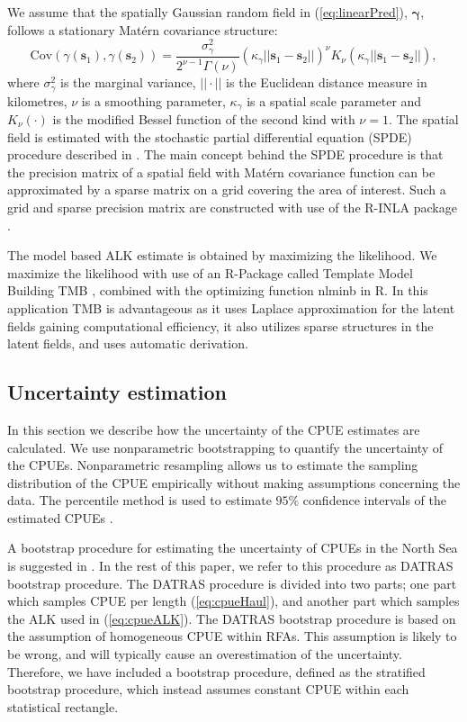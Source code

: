 \documentclass[a4paper 12pt]{article}
\numberwithin{equation}{section}
\begin{document}
\indent We assume that the spatially Gaussian random field in (\ref{eq:linearPred}), $\pmb{\gamma}$, follows a stationary Mat\'{e}rn covariance structure:
\begin{equation}\label{eq:matern}
 \text{Cov}(\gamma(\mathbf{s}_1),\gamma(\mathbf{s}_2)) = \frac{\sigma^2_{\gamma}}{2^{\nu-1}\Gamma(\nu)}(\kappa_{\gamma}||\mathbf{s}_1 -\mathbf{s}_2||)^{\nu}K_{\nu}(\kappa_{\gamma}||\mathbf{s}_1-\mathbf{s}_2||),
\end{equation}
where $\sigma^2_{\gamma}$ is the marginal variance, $||\cdot||$ is the Euclidean distance measure in kilometres, $\nu$ is a smoothing parameter, $\kappa_{\gamma}$ is a spatial scale parameter and $K_{\nu}(\cdot)$ is the modified Bessel function of the second kind with $\nu = 1$. The spatial field is estimated with the stochastic partial differential equation (SPDE) procedure described in \citet{lindgren2011explicit}. The main concept behind the SPDE procedure is that the precision matrix of a spatial field with Mat\'{e}rn  covariance function can be approximated by a sparse matrix on a grid covering the area of interest. Such a grid and sparse precision matrix are constructed with use of the R-INLA package \citep{rue2009approximate}.

The model based ALK estimate is obtained by maximizing the likelihood. We maximize the likelihood with use of an R-Package called Template Model Building {\sffamily TMB} \citep{kristensen2015tmb}, combined with the optimizing function {\sffamily nlminb} in R. In this application {\sffamily TMB} is advantageous as it uses Laplace approximation for the latent fields gaining computational efficiency, it also utilizes sparse structures in the latent fields, and uses automatic derivation. 


\subsection{Uncertainty estimation}
\label{sec:uncertaintyestimation}
In this section we describe how the uncertainty of the CPUE estimates are calculated. We use nonparametric bootstrapping to quantify the uncertainty of the CPUEs. Nonparametric resampling allows us to estimate the sampling distribution of the CPUE empirically without making assumptions concerning the data. The percentile method is used to estimate $95\%$ confidence intervals of the estimated CPUEs \citep{carpenter2000bootstrap}.

A bootstrap procedure for estimating the uncertainty of CPUEs in the North Sea is suggested in  \citet{ICES2013}. In the rest of this paper, we refer to this procedure as DATRAS bootstrap procedure. The DATRAS procedure is divided into two parts; one part which samples CPUE per length (\ref{eq:cpueHaul}), and another part which samples the ALK used in (\ref{eq:cpueALK}). The DATRAS bootstrap procedure is based on the assumption of homogeneous CPUE within RFAs. This assumption is likely to be wrong, and will typically cause an overestimation of the uncertainty. Therefore, we have included a bootstrap procedure, defined as the stratified bootstrap procedure, which instead assumes constant CPUE within each statistical rectangle. 
\end{document}
